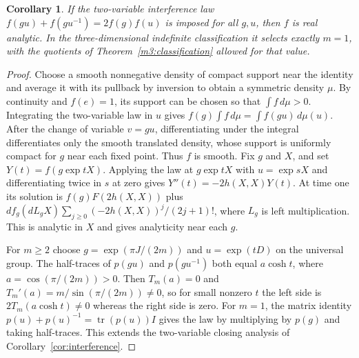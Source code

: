\documentclass[11pt,reqno]{amsart}
\newtheorem{corollary}[theorem]{Corollary}
\theoremstyle{definition}
\theoremstyle{remark}
\numberwithin{equation}{section}
\begin{document}
\begin{corollary}\label{m3:interference}
If the two-variable interference law
\(f(gu)+f(gu^{-1})=2f(g)f(u)\) is imposed for all \(g,u\),
then \(f\) is real analytic. In the three-dimensional indefinite
classification it selects exactly \(m=1\), with the quotients of
Theorem~\ref{m3:classification} allowed for that value.
\end{corollary}
\begin{proof}
Choose a smooth nonnegative density of compact support near the
identity and average it with its pullback by inversion to obtain
a symmetric density \(\mu\). By continuity and \(f(e)=1\), its
support can be chosen so that \(\int f\,d\mu>0\).
Integrating the two-variable law in \(u\) gives
\(f(g)\int f\,d\mu=\int f(gu)\,d\mu(u)\).
After the change of variable \(v=gu\), differentiating under the
integral differentiates only the smooth translated density, whose
support is uniformly compact for \(g\) near each fixed point.
Thus \(f\) is smooth. Fix \(g\) and \(X\), and set
\(Y(t)=f(g\exp tX)\). Applying the law at \(g\exp tX\) with
\(u=\exp sX\) and differentiating twice in \(s\) at zero gives
\(Y''(t)=-2h(X,X)Y(t)\).
At time one its solution is \(f(g)F(2h(X,X))\) plus
\(df_g(dL_g X)\sum_{j\ge0}(-2h(X,X))^j/(2j+1)!\), where
\(L_g\) is left multiplication. This is analytic in \(X\) and
gives analyticity near each \(g\).

For \(m\ge2\) choose \(g=\exp(\pi J/(2m))\) and \(u=\exp(tD)\)
on the universal group. The half-traces of \(p(gu)\) and
\(p(gu^{-1})\) both equal \(a\cosh t\), where
\(a=\cos(\pi/(2m))>0\). Then \(T_m(a)=0\) and
\(T_m'(a)=m/\sin(\pi/(2m))\ne0\), so for small nonzero \(t\)
the left side is \(2T_m(a\cosh t)\ne0\) whereas the right side
is zero. For \(m=1\), the matrix identity
\(p(u)+p(u)^{-1}=\operatorname{tr}(p(u))I\) gives the law by
multiplying by \(p(g)\) and taking half-traces. This extends the
two-variable closing analysis of Corollary~\ref{cor:interference}.
\end{proof}
\end{document}
